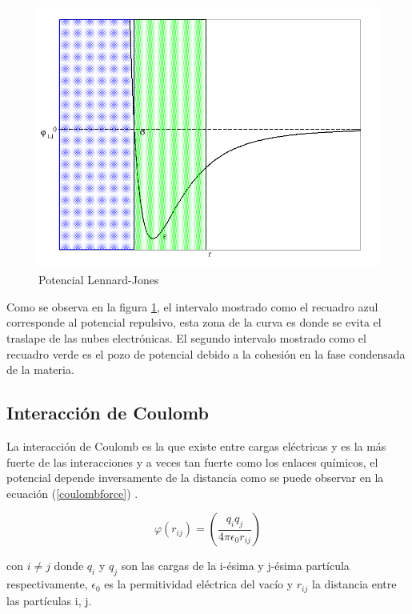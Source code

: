 \begin{figure}[!h]
    \centering
    \includegraphics[width=.7\textwidth,keepaspectratio=true]{StatMech/LJfig.png}
    \caption{Potencial Lennard-Jones}
    \label{fig:LJ126}
\end{figure}

\newpage

Como se observa en la figura \ref{fig:LJ126}, el intervalo mostrado como el recuadro azul corresponde al potencial repulsivo, esta zona de la curva es donde se evita el traslape de las nubes electrónicas. El segundo intervalo mostrado como el recuadro verde es el pozo de potencial debido a la cohesión en la fase condensada de la materia.\\

\subsection{Interacción de Coulomb}

La interacción de Coulomb es la que existe entre cargas eléctricas y es la más fuerte de las interacciones y a veces tan fuerte como los enlaces químicos, el potencial depende inversamente de la distancia como se puede observar en la ecuación (\ref{coulombforce}) \cite{ISRAELACHVILI201153}.

\begin{equation} \label{coulombforce}
    \varphi(r_{ij}) = \left(\frac{q_i q_j}{4\pi \epsilon_{0} r_{ij}}\right)
\end{equation}

\noindent con $i\neq j$ donde $q_i$ y $q_j$ son las cargas de la i-ésima y j-ésima partícula respectivamente, $\epsilon_0$ es la permitividad eléctrica del vacío y $r_{ij}$ la distancia entre las partículas i, j. 



